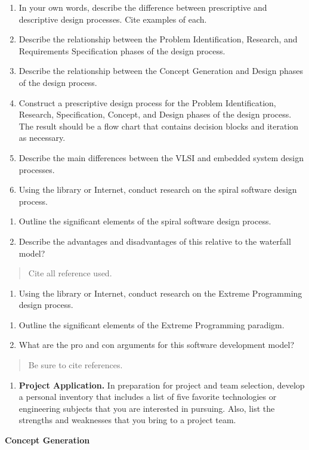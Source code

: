 \begin{enumerate}
\def\labelenumi{\arabic{enumi}.}
\item
  In your own words, describe the difference between prescriptive and
  descriptive design processes. Cite examples of each.
\item
  Describe the relationship between the Problem Identification,
  Research, and Requirements Specification phases of the design process.
\item
  Describe the relationship between the Concept Generation and Design
  phases of the design process.
\item
  Construct a prescriptive design process for the Problem
  Identification, Research, Specification, Concept, and Design phases of
  the design process. The result should be a flow chart that contains
  decision blocks and iteration as necessary.
\item
  Describe the main differences between the VLSI and embedded system
  design processes.
\item
  Using the library or Internet, conduct research on the spiral software
  design process.
\end{enumerate}

\begin{enumerate}
\def\labelenumi{\alph{enumi})}
\item
  Outline the significant elements of the spiral software design
  process.
\item
  Describe the advantages and disadvantages of this relative to the
  waterfall model?
\end{enumerate}

\begin{quote}
Cite all reference used.
\end{quote}

\begin{enumerate}
\def\labelenumi{\arabic{enumi}.}
\item
  Using the library or Internet, conduct research on the Extreme
  Programming design process.
\end{enumerate}

\begin{enumerate}
\def\labelenumi{\alph{enumi})}
\item
  Outline the significant elements of the Extreme Programming paradigm.
\item
  What are the pro and con arguments for this software development
  model?
\end{enumerate}

\begin{quote}
Be sure to cite references.
\end{quote}

\begin{enumerate}
\def\labelenumi{\arabic{enumi}.}
\item
  \textbf{Project Application.} In preparation for project and team
  selection, develop a personal inventory that includes a list of five
  favorite technologies or engineering subjects that you are interested
  in pursuing. Also, list the strengths and weaknesses that you bring to
  a project team.
\end{enumerate}

\textbf{Concept Generation}
